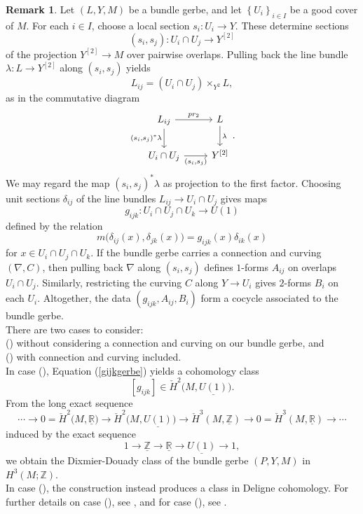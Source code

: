 \documentclass{article}
\theoremstyle{plain}
\theoremstyle{definition}
\newtheorem{rem}[thm]{Remark}
\newcommand{\rNum}[1]{\lowercase\expandafter{\romannumeral #1\relax}}
\begin{document}
\begin{rem}\cite[Section 1.1]{Wal2007phd}\label{clager}
Let $(L,Y,M)$ be a bundle gerbe, and let $\left\{U_i\right\}_{i \in I}$ be a good cover of $M$. For each $i \in I$, choose a local section $s_i:U_i \longrightarrow Y$. These determine sections 
$$(s_i,s_j):U_i \cap U_j \longrightarrow Y^{[2]}$$
of the projection $Y^{[2]} \longrightarrow M$ over pairwise overlaps. Pulling back the line bundle $\lambda:L \longrightarrow Y^{[2]}$ along $(s_i,s_j)$ yields
\[
L_{ij} = (U_i \cap U_j) \times_{Y^{2}} L,
\]
as in the commutative diagram
\[
\begin{tikzcd}
L_{ij} \arrow[r,"pr_2"] \arrow[d,"{(s_i,s_j)^*\lambda}"'] & L \arrow[d,"\lambda"] \\
U_i \cap U_j \arrow[r,"{(s_i,s_j)}"'] & Y^{[2]}
\end{tikzcd}.
\]
We may regard the map $(s_i,s_j)^*\lambda$ as projection to the first factor. Choosing unit sections $\delta_{ij}$ of the line bundles $L_{ij} \longrightarrow U_i \cap U_j$ gives maps
\begin{equation}\label{gijkgerbe}
g_{ijk}:U_i \cap U_j \cap U_k \longrightarrow U(1)
\end{equation}
defined by the relation
$$m\bigl(\delta_{ij}(x),\delta_{jk}(x)\bigr) = g_{ijk}(x) \delta_{ik}(x)$$
for $x \in U_i \cap U_j \cap U_k$. If the bundle gerbe carries a connection and curving $(\nabla,C)$, then pulling back $\nabla$ along $(s_i,s_j)$ defines $1$-forms $A_{ij}$ on overlaps $U_i \cap U_j$. Similarly, restricting the curving $C$ along $Y \longrightarrow U_i$ gives $2$-forms $B_i$ on each $U_i$. Altogether, the data $(g_{ijk},A_{ij},B_i)$ form a cocycle associated to the bundle gerbe. \\
There are two cases to consider: \\
(\rNum{1}) without considering a connection and curving on our bundle gerbe, and \\
(\rNum{2}) with connection and curving included. \\
In case (\rNum{1}), Equation (\ref{gijkgerbe}) yields a cohomology class
$$[g_{ijk}] \in \check{H}^2\bigr(M,\underline{U(1)}\bigr).$$
From the long exact sequence
$$\cdots \longrightarrow 0 = \check{H}^2\bigl(M,\underline{\mathbb{R}}\bigr) \longrightarrow \check{H}^2\bigl(M,\underline{U(1)}\bigr) \longrightarrow \check{H}^3(M,\underline{\mathbb{Z}}) \longrightarrow 0 = \check{H}^3(M,\underline{\mathbb{R}}) \longrightarrow \cdots$$
induced by the exact sequence
$$1 \longrightarrow \underline{\mathbb{Z}} \longrightarrow \underline{\mathbb{R}} \longrightarrow \underline{U(1)} \longrightarrow 1,$$
we obtain the Dixmier-Douady class of the bundle gerbe $(P,Y,M)$ in $H^3(M;\mathbb{Z})$. \\
In case (\rNum{2}), the construction instead produces a class in Deligne cohomology. For further details on case (\rNum{1}), see \cite[on page 245]{MR2681698}, and for case (\rNum{2}), see \cite[Section 1.3]{Wal2007phd}.
\end{rem}
\end{document}
